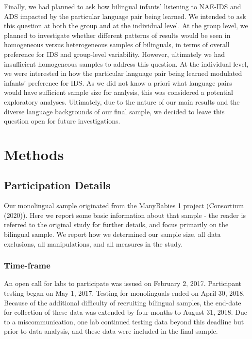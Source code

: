 \documentclass[,man,floatsintext]{apa6}
\begin{document}
\begin{enumerate}
  Finally, we had planned to ask how bilingual infants' listening to NAE-IDS and ADS impacted by the particular language pair being learned. We intended to ask this question at both the group and at the individual level. At the group level, we planned to investigate whether different patterns of results would be seen in homogeneous versus heterogeneous samples of bilinguals, in terms of overall preference for IDS and group-level variability. However, ultimately we had insufficient homogeneous samples to address this question. At the individual level, we were interested in how the particular language pair being learned modulated infants' preference for IDS. As we did not know a priori what language pairs would have sufficient sample size for analysis, this was considered a potential exploratory analyses. Ultimately, due to the nature of our main results and the diverse language backgrounds of our final sample, we decided to leave this question open for future investigations.
\end{enumerate}

\hypertarget{methods}{%
\section{Methods}\label{methods}}

\hypertarget{participation-details}{%
\subsection{Participation Details}\label{participation-details}}

Our monolingual sample originated from the ManyBabies 1 project (Consortium (2020)). Here we report some basic information about that sample - the reader is referred to the original study for further details, and focus primarily on the bilingual sample. We report how we determined our sample size, all data exclusions, all manipulations, and all measures in the study.

\hypertarget{time-frame}{%
\subsubsection{Time-frame}\label{time-frame}}

An open call for labs to participate was issued on February 2, 2017. Participant testing began on May 1, 2017. Testing for monolinguals ended on April 30, 2018. Because of the additional difficulty of recruiting bilingual samples, the end-date for collection of these data was extended by four months to August 31, 2018. Due to a miscommunication, one lab continued testing data beyond this deadline but prior to data analysis, and these data were included in the final sample.
\end{document}
